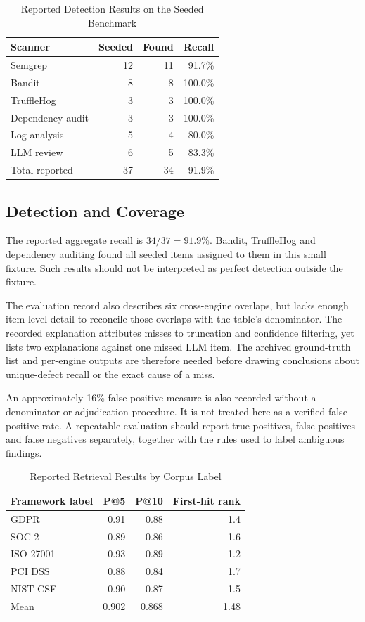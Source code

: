 \documentclass[conference,letterpaper]{IEEEtran}
\begin{document}
\begin{table}[t]
\caption{Reported Detection Results on the Seeded Benchmark}
\label{tab:detection}
\centering\footnotesize
\begin{tabularx}{\columnwidth}{@{}Yrrr@{}}
\toprule
Scanner & Seeded & Found & Recall \\
\midrule
Semgrep & 12 & 11 & 91.7\% \\
Bandit & 8 & 8 & 100.0\% \\
TruffleHog & 3 & 3 & 100.0\% \\
Dependency audit & 3 & 3 & 100.0\% \\
Log analysis & 5 & 4 & 80.0\% \\
LLM review & 6 & 5 & 83.3\% \\
\midrule
Total reported & 37 & 34 & 91.9\% \\
\bottomrule
\end{tabularx}
\end{table}

\subsection{Detection and Coverage}
The reported aggregate recall is $34/37=91.9\%$. Bandit, TruffleHog and dependency auditing found all seeded items assigned to them in this small fixture. Such results should not be interpreted as perfect detection outside the fixture.

The evaluation record also describes six cross-engine overlaps, but lacks enough item-level detail to reconcile those overlaps with the table's denominator. The recorded explanation attributes misses to truncation and confidence filtering, yet lists two explanations against one missed LLM item. The archived ground-truth list and per-engine outputs are therefore needed before drawing conclusions about unique-defect recall or the exact cause of a miss.

An approximately 16\% false-positive measure is also recorded without a denominator or adjudication procedure. It is not treated here as a verified false-positive rate. A repeatable evaluation should report true positives, false positives and false negatives separately, together with the rules used to label ambiguous findings.

\begin{table}[t]
\caption{Reported Retrieval Results by Corpus Label}
\label{tab:retrieval}
\centering\footnotesize
\begin{tabularx}{\columnwidth}{@{}Yrrr@{}}
\toprule
Framework label & P@5 & P@10 & First-hit rank \\
\midrule
GDPR & 0.91 & 0.88 & 1.4 \\
SOC 2 & 0.89 & 0.86 & 1.6 \\
ISO 27001 & 0.93 & 0.89 & 1.2 \\
PCI DSS & 0.88 & 0.84 & 1.7 \\
NIST CSF & 0.90 & 0.87 & 1.5 \\
\midrule
Mean & 0.902 & 0.868 & 1.48 \\
\bottomrule
\end{tabularx}
\end{table}
\end{document}
